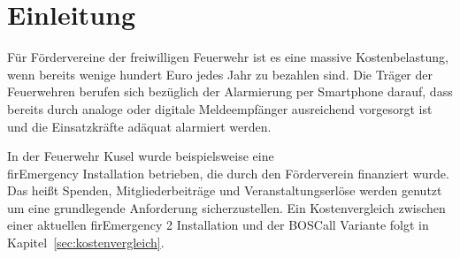 \section{Einleitung}
Für Fördervereine der freiwilligen Feuerwehr ist es eine massive Kostenbelastung, wenn bereits wenige hundert Euro jedes Jahr zu bezahlen sind. Die Träger der Feuerwehren berufen sich bezüglich der Alarmierung per Smartphone darauf, dass bereits durch analoge oder digitale Meldeempfänger ausreichend vorgesorgt ist und die Einsatzkräfte adäquat alarmiert werden.

In der Feuerwehr Kusel wurde beispielsweise eine\\ firEmergency\cite{Alamos:FE2} Installation betrieben, die durch den Förderverein finanziert wurde. Das heißt Spenden, Mitgliederbeiträge und Veranstaltungserlöse werden genutzt um eine grundlegende Anforderung sicherzustellen. Ein Kostenvergleich zwischen einer aktuellen {firEmergency 2} Installation und der BOSCall Variante folgt in Kapitel~\ref{sec:kostenvergleich}.